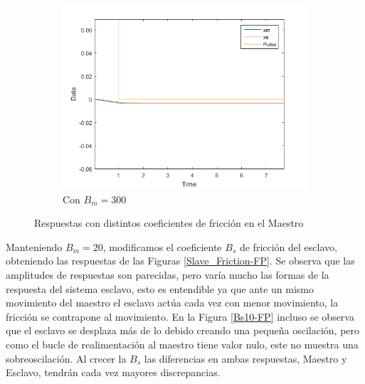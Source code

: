 \documentclass[a4paper, fontsize=11pt]{scrartcl} %
\numberwithin{equation}{section} %
\numberwithin{figure}{section} %
\numberwithin{table}{section} %
\begin{document}
\begin{figure}[h!]
\begin{subfigure}[t]{.5\textwidth}
			\includegraphics[width=1\linewidth]{images/Bm300-FP.PNG}
			\caption{Con $B_m = 300$}
			\label{Bm300-FP}
		\end{subfigure}
		\caption{Respuestas con distintos coeficientes de fricción en el Maestro}
		\label{Master_Friction-FP}
	\end{figure}
	\FloatBarrier
	
	Manteniendo $B_m = 20$, modificamos el coeficiente $B_s$ de fricción del esclavo, obteniendo las respuestas de las Figuras \ref{Slave_Friction-FP}. Se observa que las amplitudes de respuestas son parecidas, pero varía mucho las formas de la respuesta del sistema esclavo, esto es entendible ya que ante un mismo movimiento del maestro el esclavo actúa cada vez con menor movimiento, la fricción se contrapone al movimiento. En la Figura \ref{Bs10-FP} incluso se observa que el esclavo se desplaza más de lo debido creando una pequeña oscilación, pero como el bucle de realimentación al maestro tiene valor nulo, este no muestra una sobreoscilación. Al crecer la $B_s$ las diferencias en ambas respuestas, Maestro y Esclavo, tendrán cada vez mayores discrepancias.\\
	
\end{document}
